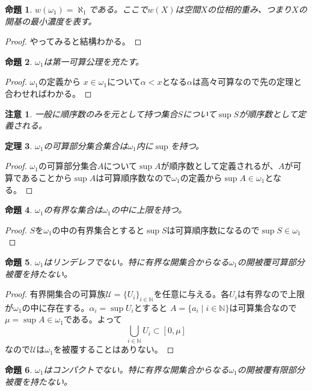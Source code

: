 \documentclass[leqno]{jsarticle}
\newtheorem{thm}{定理}
\newtheorem{prop}[thm]{命題}
\newtheorem*{cau}{注意}
\newcommand{\nn}{\mathbb{N}}
\newcommand{\al}{\alpha}
\begin{document}
\begin{prop}
$w(\omega_1)=\aleph_1$である。ここで$w(X)$は空間$X$の位相的重み、つまり$X$の開基の最小濃度を表す。
\end{prop}
\begin{proof}
やってみると結構わかる。
\end{proof}

\begin{prop}
$\omega_1$は第一可算公理を充たす。
\end{prop}
\begin{proof}
$\omega_1$の定義から
$x\in\omega_1$について$\al<x$となる$\al$は高々可算なので先の定理と合わせればわかる。
\end{proof}

\begin{cau}
一般に順序数のみを元として持つ集合$S$について$\sup S$が順序数として定義される。
\end{cau}

\begin{thm}
$\omega_1$の可算部分集合集合は$\omega_1$内に$\sup$を持つ。
\end{thm}
\begin{proof}
$\omega_1$の可算部分集合$A$について$\sup A$が順序数として定義されるが、$A$が可算であることから$\sup A$は可算順序数なので$\omega_1$の定義から$\sup A\in \omega_1$となる。
\end{proof}


\begin{prop}
$\omega_1$の有界な集合は$\omega_1$の中に上限を持つ。
\end{prop}
\begin{proof}
$S$を$\omega_1$の中の有界集合とすると$\sup S$は可算順序数になるので$\sup S\in \omega_1$
\end{proof}


\begin{prop}
$\omega_1$はリンデレフでない。特に有界な開集合からなる$\omega_1$の開被覆可算部分被覆を持たない。
\end{prop}
\begin{proof}
有界開集合の可算族$\mathcal{U}=\{U_i\}_{i\in \nn}$を任意に与える。各$U_i$は有界なので上限が$\omega_1$の中に存在する。$\al_i=\sup U_i$とすると
$A=\{a_i\mid i\in \nn\}$は可算集合なので$\mu=\sup A\in \omega_1$である。よって
\[
\bigcup_{i\in \nn}U_i\subset [0,\mu]
\]
なので$\mathcal{U}$は$\omega_1$を被覆することはありない。
\end{proof}


\begin{prop}
$\omega_1$はコンパクトでない。特に有界な開集合からなる$\omega_1$の開被覆有限部分被覆を持たない。
\end{prop}
\end{document}
